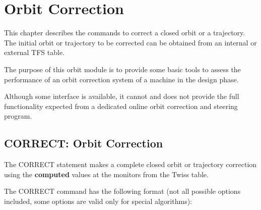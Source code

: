 
\chapter{Orbit Correction}  

This chapter describes the commands to correct a closed orbit or a
trajectory. The initial orbit or trajectory to be corrected can be
obtained  from an internal or external TFS table.   

The purpose of this orbit module is to provide some basic tools to
assess the performance of an orbit correction system of a machine in the
design phase.  

Although some interface is available, it cannot and does not provide the
full functionality expected from a dedicated online orbit correction and
steering program.  

%
\section{CORRECT: Orbit Correction}  
\label{sec:correct}

The CORRECT statement makes a complete closed orbit  or trajectory
correction using the \textbf{computed} values at the monitors  from the
Twiss table.   

The CORRECT command has the following format (not all possible options
included, some options are valid only for special algorithms):  


